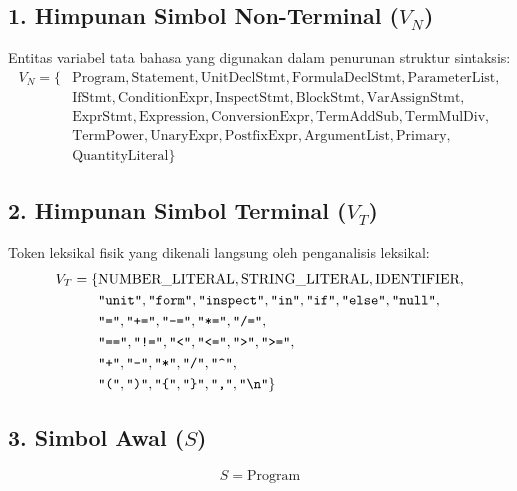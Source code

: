 \documentclass[11pt,a4paper]{article}
\begin{document}
\subsection{1. Himpunan Simbol Non-Terminal ($V_N$)}
Entitas variabel tata bahasa yang digunakan dalam penurunan struktur sintaksis:
\begin{align*}
V_N = \{ & \text{Program}, \text{Statement}, \text{UnitDeclStmt}, \text{FormulaDeclStmt}, \text{ParameterList}, \\
         & \text{IfStmt}, \text{ConditionExpr}, \text{InspectStmt}, \text{BlockStmt}, \text{VarAssignStmt}, \\
         & \text{ExprStmt}, \text{Expression}, \text{ConversionExpr}, \text{TermAddSub}, \text{TermMulDiv}, \\
         & \text{TermPower}, \text{UnaryExpr}, \text{PostfixExpr}, \text{ArgumentList}, \text{Primary}, \\
         & \text{QuantityLiteral} \}
\end{align*}

\subsection{2. Himpunan Simbol Terminal ($V_T$)}
Token leksikal fisik yang dikenali langsung oleh penganalisis leksikal:
\begin{align*}
V_T = \{ & \text{NUMBER\_LITERAL}, \text{STRING\_LITERAL}, \text{IDENTIFIER}, \\
         & \texttt{"unit"}, \texttt{"form"}, \texttt{"inspect"}, \texttt{"in"}, \texttt{"if"}, \texttt{"else"}, \texttt{"null"}, \\
         & \texttt{"="}, \texttt{"+="}, \texttt{"-="}, \texttt{"*="}, \texttt{"/="}, \\
         & \texttt{"=="}, \texttt{"!="}, \texttt{"<"}, \texttt{"<="}, \texttt{">"}, \texttt{">="}, \\
         & \texttt{"+"}, \texttt{"-"}, \texttt{"*"}, \texttt{"/"}, \texttt{"\string^"}, \\
         & \texttt{"("}, \texttt{")"}, \texttt{"\{"}, \texttt{"\}"}, \texttt{","}, \texttt{"\textbackslash n"} \}
\end{align*}

\subsection{3. Simbol Awal ($S$)}
\begin{equation*}
    S = \text{Program}
\end{equation*}
\end{document}
